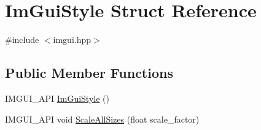 \hypertarget{struct_im_gui_style}{}\section{Im\+Gui\+Style Struct Reference}
\label{struct_im_gui_style}


{\ttfamily \#include $<$imgui.\+hpp$>$}

\subsection*{Public Member Functions}
\begin{DoxyCompactItemize}
\item 
I\+M\+G\+U\+I\+\_\+\+A\+PI \hyperlink{struct_im_gui_style_ab0a3ffb3aeec3e6b09b9bde812b28369}{Im\+Gui\+Style} ()
\item 
I\+M\+G\+U\+I\+\_\+\+A\+PI void \hyperlink{struct_im_gui_style_a7c9d3e0974a239f65e433cc952be0627}{Scale\+All\+Sizes} (float scale\+\_\+factor)
\end{DoxyCompactItemize}
